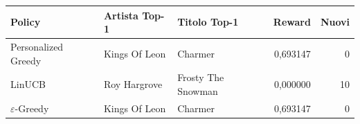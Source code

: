 \begin{tabular}{lp{2.6cm}p{4.3cm}rr}
\toprule
Policy & Artista Top-1 & Titolo Top-1 & Reward & Nuovi \\
\midrule
Personalized Greedy & Kings Of Leon & Charmer & 0,693147 & 0 \\
LinUCB & Roy Hargrove & Frosty The Snowman & 0,000000 & 10 \\
$\varepsilon$-Greedy & Kings Of Leon & Charmer & 0,693147 & 0 \\
\bottomrule
\end{tabular}
